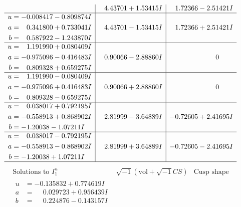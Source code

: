 \documentclass[1p]{elsarticle_modified}
\theoremstyle{definition}
\newcommand{\I}{\sqrt{-1}}
\begin{document}
$$\begin{array}{c|c|c}
 & \phantom{-}4.43701 + 1.53415 I & \phantom{-}1.72366 - 2.51421 I \\ \hline\begin{aligned}
u &= -0.008417 - 0.809874 I \\
a &= \phantom{-}0.341800 + 0.733041 I \\
b &= \phantom{-}0.587922 - 1.243870 I\end{aligned}
 & \phantom{-}4.43701 - 1.53415 I & \phantom{-}1.72366 + 2.51421 I \\ \hline\begin{aligned}
u &= \phantom{-}1.191990 + 0.080409 I \\
a &= -0.975096 - 0.416483 I \\
b &= \phantom{-}0.809328 + 0.659275 I\end{aligned}
 & \phantom{-}0.90066 - 2.88860 I & \phantom{-0.000000 } 0 \\ \hline\begin{aligned}
u &= \phantom{-}1.191990 - 0.080409 I \\
a &= -0.975096 + 0.416483 I \\
b &= \phantom{-}0.809328 - 0.659275 I\end{aligned}
 & \phantom{-}0.90066 + 2.88860 I & \phantom{-0.000000 } 0 \\ \hline\begin{aligned}
u &= \phantom{-}0.038017 + 0.792195 I \\
a &= -0.558913 + 0.868902 I \\
b &= -1.20038 - 1.07211 I\end{aligned}
 & \phantom{-}2.81999 - 3.64889 I & -0.72605 + 2.41695 I \\ \hline\begin{aligned}
u &= \phantom{-}0.038017 - 0.792195 I \\
a &= -0.558913 - 0.868902 I \\
b &= -1.20038 + 1.07211 I\end{aligned}
 & \phantom{-}2.81999 + 3.64889 I & -0.72605 - 2.41695 I\\
 \hline 
 \end{array}$$\newpage$$\begin{array}{c|c|c}  
\text{Solutions to }I^u_{1}& \I (\text{vol} + \sqrt{-1}CS) & \text{Cusp shape}\\
 \hline 
\begin{aligned}
u &= -0.135832 + 0.774619 I \\
a &= \phantom{-}0.029723 + 0.956439 I \\
b &= \phantom{-}0.224876 - 0.143157 I\end{aligned}

\end{array}$$
\end{document}
